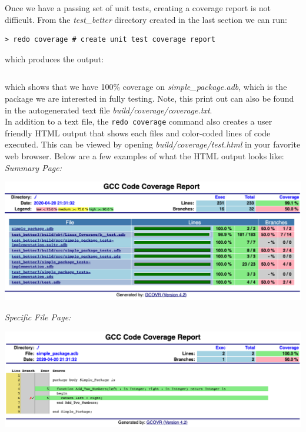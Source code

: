 Once we have a passing set of unit tests, creating a coverage report is not difficult. From the \textit{test\_better} directory created in the last section we can run:

\vspace{5mm} %
\begin{verbatim}
> redo coverage # create unit test coverage report
\end{verbatim}
\vspace{5mm} %

which produces the output:

\vspace{5mm} %
\inputminted{text}{../example_architecture/simple_package/test_better3/build/coverage/coverage.txt}
\vspace{5mm} %

which shows that we have 100\% coverage on \textit{simple\_package.adb}, which is the package we are interested in fully testing. Note, this print out can also be found in the autogenerated text file \textit{build/coverage/coverage.txt}. \\

In addition to a text file, the \texttt{redo coverage} command also creates a user friendly HTML output that shows each files and color-coded lines of code executed. This can be viewed by opening \textit{build/coverage/test.html} in your favorite web browser. Below are a few examples of what the HTML output looks like: \\

\textit{Summary Page:}

\vspace{5mm} %
\includegraphics[width=\textwidth]{images/gcovr1.png}
\vspace{5mm} %

\textit{Specific File Page:}

\vspace{5mm} %
\includegraphics[width=\textwidth]{images/gcovr2.png}
\vspace{5mm} %


